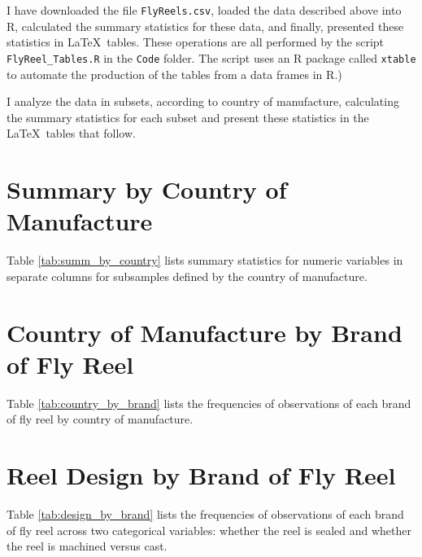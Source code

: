 \documentclass[11pt]{article}
\begin{document}
\bigskip
\noindent
I have downloaded the file {\tt FlyReels.csv}, 
loaded the data described above into 
\textsf{R}, 
calculated the summary statistics for these data, 
and finally, presented 
these statistics in \LaTeX\ tables.
These operations are all performed by the script 
{\tt FlyReel\_Tables.R} in the {\tt Code} folder. 
The script uses an \textsf{R} package called {\tt xtable} 
to automate the
production of the tables from a data frames in \textsf{R}.)

\medskip
\noindent
I analyze the data in subsets, according to country of manufacture, 
calculating the summary statistics for each subset and present these 
statistics in the \LaTeX\ tables that follow.

\vfill


\pagebreak
\section{Summary by Country of Manufacture}

Table \ref{tab:summ_by_country} lists summary statistics for numeric variables
in separate columns for subsamples defined by the country of manufacture. 




\pagebreak
\section{Country of Manufacture by Brand of Fly Reel}

Table \ref{tab:country_by_brand} lists the frequencies of observations of 
each brand of fly reel by country of manufacture. 



\pagebreak
\section{Reel Design by Brand of Fly Reel}

Table \ref{tab:design_by_brand} lists the frequencies of observations of 
each brand of fly reel across two categorical variables:
whether the reel is sealed
and whether the reel is machined versus cast. 





\end{document}
